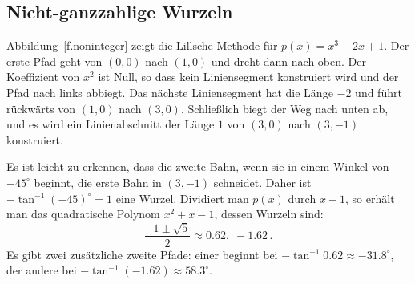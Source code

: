 \subsection{Nicht-ganzzahlige Wurzeln}\label{s.noninteger}
Abbildung~\ref{f.noninteger} zeigt die Lillsche Methode für $p(x)=x^3-2x+1$. Der erste Pfad geht von $(0,0)$ nach $(1,0)$ und dreht dann nach oben. Der Koeffizient von $x^2$ ist Null, so dass kein Liniensegment konstruiert wird und der Pfad nach links abbiegt. Das nächste Liniensegment hat die Länge $-2$ und führt rückwärts von $(1,0)$ nach $(3,0)$. Schließlich biegt der Weg nach unten ab, und es wird ein Linienabschnitt der Länge $1$ von $(3,0)$ nach $(3,-1)$ konstruiert.

Es ist leicht zu erkennen, dass die zweite Bahn, wenn sie in einem Winkel von $-45^\circ$ beginnt, die erste Bahn in $(3,-1)$ schneidet. Daher ist $-\tan^{-1} (-45)^\circ=1$ eine Wurzel. Dividiert man $p(x)$ durch $x-1$, so erhält man das quadratische Polynom $x^2+x-1$, dessen Wurzeln sind:
\[
\frac{-1\pm\sqrt{5}}{2} \approx 0.62,\; -1.62\,.
\]
Es gibt zwei zusätzliche zweite Pfade: einer beginnt bei $-\tan^{-1} 0.62\approx -31.8^\circ$, der andere bei $-\tan^{-1}(-1.62)\approx 58.3^\circ$.

